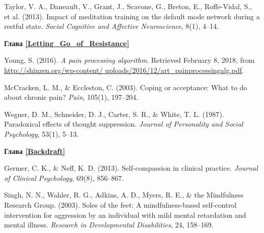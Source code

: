 \begin{thebibliography}{999}
	 Taylor, V. A., Daneault, V., Grant, J., Scavone, G., Breton, E., Roffe-Vidal, S., et al. (2013). Impact of meditation training on the default mode network during a restful state. \textit{Social Cognitive and Affective Neuroscience}, 8(1), 4–14.
	 
	 
	\vspace{3ex}
	\textbf{Глава \ref{Letting_Go_of_Resistance}}
	
	 Young, S. (2016). \textit{A pain processing algorithm}. Retrieved February 8, 2018, from \url{http://shinzen.org/wp-content/ uploads/2016/12/art_painprocessingalg.pdf}.
	
	 McCracken, L. M., \& Eccleston, C. (2003). Coping or acceptance: What to do about chronic pain? \textit{Pain}, 105(1), 197–204.
	
	 Wegner, D. M., Schneider, D. J., Carter, S. R., \& White, T. L. (1987). Paradoxical effects of thought suppression. \textit{Journal of Personality and Social Psychology}, 53(1), 5–13.
	
	
	\vspace{3ex}
	\textbf{Глава \ref{Backdraft}}
	
	 Germer, C. K., \& Neff, K. D. (2013). Self-compassion in clinical practice. \textit{Journal of Clinical Psychology}, 69(8), 856–867.
	
	 Singh, N. N., Wahler, R. G., Adkins, A. D., Myers, R. E., \& the Mindfulness Research Group. (2003). Soles of the feet: A mindfulness-based self-control intervention for aggression by an individual with mild mental retardation and mental illness. \textit{Research in Developmental Disabilities}, 24, 158–169.
\end{thebibliography}
